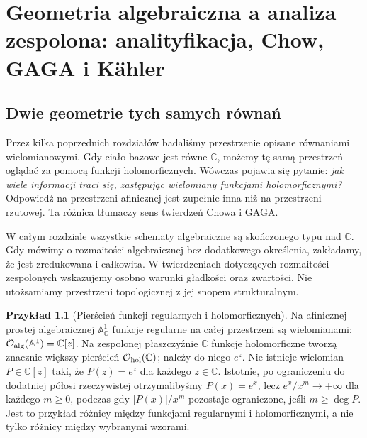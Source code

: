 \documentclass[11pt,a4paper,openany]{report}
\numberwithin{equation}{section}
\theoremstyle{plain}
\theoremstyle{definition}
\newtheorem{przyklad}[twierdzenie]{Przykład}
\theoremstyle{remark}
\newcommand{\C}{\mathbb C}
\newcommand{\A}{\mathbb A}
\begin{document}

\chapter{Geometria algebraiczna a analiza zespolona: analityfikacja, Chow, GAGA i Kähler}
\label{ch:ga9-analiza-zespolona}

\providecommand{\atlasref}[2]{#2}


\section{Dwie geometrie tych samych równań}
\label{sec:ga9-motywacja}

Przez kilka poprzednich rozdziałów badaliśmy przestrzenie opisane równaniami
wielomianowymi. Gdy ciało bazowe jest równe $\C$, możemy tę samą przestrzeń
oglądać za pomocą funkcji holomorficznych. Wówczas pojawia się pytanie:
\emph{jak wiele informacji traci się, zastępując wielomiany funkcjami
holomorficznymi?} Odpowiedź na przestrzeni afinicznej jest zupełnie inna niż
na przestrzeni rzutowej. Ta różnica tłumaczy sens twierdzeń Chowa i GAGA.

W całym rozdziale wszystkie schematy algebraiczne są skończonego typu nad
$\C$. Gdy mówimy o rozmaitości algebraicznej bez dodatkowego określenia,
zakładamy, że jest zredukowana i całkowita. W twierdzeniach dotyczących
rozmaitości zespolonych wskazujemy osobno warunki gładkości oraz zwartości.
Nie utożsamiamy przestrzeni topologicznej z jej snopem strukturalnym.

\begin{przyklad}[Pierścień funkcji regularnych i holomorficznych]
Na afinicznej prostej algebraicznej $\A^1_\C$ funkcje regularne na całej
przestrzeni są wielomianami: $\mathcal O_{\rm alg}(\A^1)=\C[z]$.
Na zespolonej płaszczyźnie $\C$ funkcje holomorficzne tworzą znacznie
większy pierścień $\mathcal O_{\rm hol}(\C)$; należy do niego $e^z$.
Nie istnieje wielomian $P\in\C[z]$ taki, że $P(z)=e^z$ dla każdego
$z\in\C$. Istotnie, po ograniczeniu do dodatniej półosi rzeczywistej
otrzymalibyśmy $P(x)=e^x$, lecz $e^x/x^m\to+\infty$ dla każdego
$m\ge0$, podczas gdy $|P(x)|/x^m$ pozostaje ograniczone, jeśli
$m\ge\deg P$. Jest to przykład różnicy między funkcjami regularnymi
i holomorficznymi, a nie tylko różnicy między wybranymi wzorami.
\end{przyklad}
\end{document}
